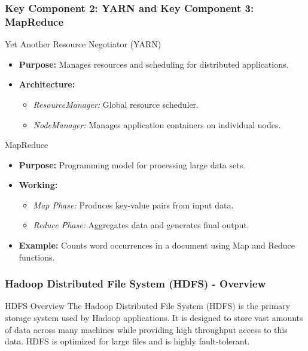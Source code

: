\documentclass[aspectratio=169]{beamer}
\begin{document}
\begin{frame}[fragile]
  \frametitle{Key Component 2: YARN and Key Component 3: MapReduce}
  \begin{block}{Yet Another Resource Negotiator (YARN)}
      \begin{itemize}
          \item \textbf{Purpose:} Manages resources and scheduling for distributed applications.
          \item \textbf{Architecture:}
          \begin{itemize}
              \item \textit{ResourceManager:} Global resource scheduler.
              \item \textit{NodeManager:} Manages application containers on individual nodes.
          \end{itemize}
      \end{itemize}
  \end{block}

  \begin{block}{MapReduce}
      \begin{itemize}
          \item \textbf{Purpose:} Programming model for processing large data sets.
          \item \textbf{Working:}
          \begin{itemize}
              \item \textit{Map Phase:} Produces key-value pairs from input data.
              \item \textit{Reduce Phase:} Aggregates data and generates final output.
          \end{itemize}
          \item \textbf{Example:} Counts word occurrences in a document using Map and Reduce functions.
      \end{itemize}
  \end{block}
\end{frame}

\begin{frame}[fragile]
    \frametitle{Hadoop Distributed File System (HDFS) - Overview}
    \begin{block}{HDFS Overview}
        The Hadoop Distributed File System (HDFS) is the primary storage system used by Hadoop applications. It is designed to store vast amounts of data across many machines while providing high throughput access to this data. HDFS is optimized for large files and is highly fault-tolerant.
    \end{block}
\end{frame}
\end{document}
